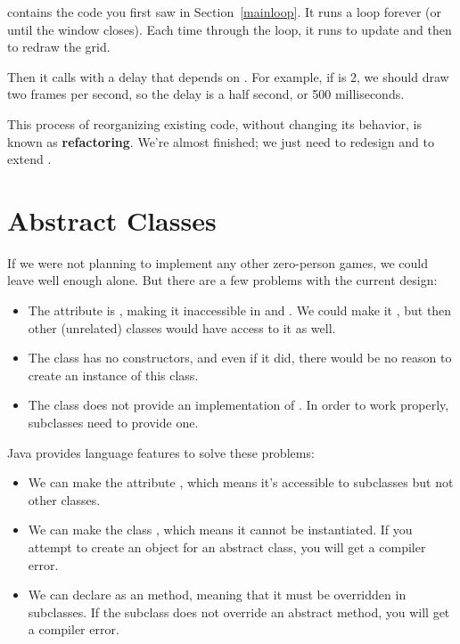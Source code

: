  contains the code you first saw in Section~\ref{mainloop}.
It runs a  loop forever (or until the window closes).
Each time through the loop, it runs  to update  and then  to redraw the grid.

Then it calls  with a delay that depends on .
For example, if  is 2, we should draw two frames per second, so the delay is a half second, or 500 milliseconds.


This process of reorganizing existing code, without changing its behavior, is known as {\bf refactoring}.
We're almost finished; we just need to redesign  and  to extend .


\section{Abstract Classes}

If we were not planning to implement any other zero-person games, we could leave well enough alone.
But there are a few problems with the current design:

\begin{itemize}

\item The  attribute is , making it inaccessible in  and .
We could make it , but then other (unrelated) classes would have access to it as well.

\item The  class has no constructors, and even if it did, there would be no reason to create an instance of this class.

\item The  class does not provide an implementation of .
In order to work properly, subclasses need to provide one.

\end{itemize}


Java provides language features to solve these problems:

\begin{itemize}

\item We can make the  attribute , which means it's accessible to subclasses but not other classes.

\item We can make the class , which means it cannot be instantiated.
If you attempt to create an object for an abstract class, you will get a compiler error.

\item We can declare  as an  method, meaning that it must be overridden in subclasses.
If the subclass does not override an abstract method, you will get a compiler error.

\end{itemize}

